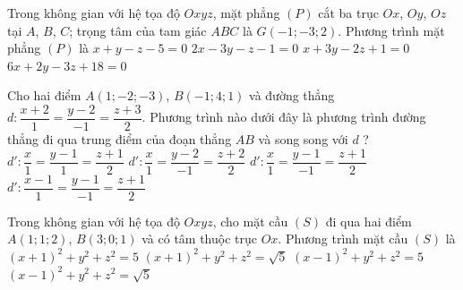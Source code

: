 \begin{ex}%
	Trong không gian với hệ tọa độ $Oxyz$, mặt phẳng $(P)$ cắt ba trục $Ox$, $Oy$, $Oz$ tại $A$, $B$, $C$; trọng tâm của tam giác $ABC$ là $G(-1;-3;2)$. Phương trình mặt phẳng $(P)$ là
	\choice
	{$x+y-z-5=0$}
	{$2x-3y-z-1=0$}
	{$x+3y-2z+1=0$}
	{\True $6x+2y-3z+18=0$}
\end{ex}
\begin{ex}%
	Cho hai điểm $A(1;-2;-3)$, $B(-1;4;1)$ và đường thẳng $d \colon \dfrac{x+2}{1}=\dfrac{y-2}{-1}=\dfrac{z+3}{2}$. Phương trình nào dưới đây là phương trình đường thẳng đi qua trung điểm của đoạn thẳng $AB$ và song song với $d$ ?
	\choice
	{$d' \colon \dfrac{x}{1}=\dfrac{y-1}{1}=\dfrac{z+1}{2}$}
	{$d'\colon \dfrac{x}{1}=\dfrac{y-2}{-1}=\dfrac{z+2}{2}$}
	{\True $d'\colon \dfrac{x}{1}=\dfrac{y-1}{-1}=\dfrac{z+1}{2}$}
	{$d'\colon \dfrac{x-1}{1}=\dfrac{y-1}{-1}=\dfrac{z+1}{2}$}
\end{ex}
\begin{ex}%
	Trong không gian với hệ tọa độ $Oxyz$, cho mặt cầu $(S)$ đi qua hai điểm $A(1;1;2)$, $B(3;0;1)$ và có tâm thuộc trục $Ox$. Phương trình mặt cầu $(S)$ là
	\choice
	{$(x+1)^{2}+y^{2}+z^{2}=5$}
	{$(x+1)^{2}+y^{2}+z^{2}=\sqrt{5}$}
	{\True $(x-1)^{2}+y^{2}+z^{2}=5$}
	{$(x-1)^{2}+y^{2}+z^{2}=\sqrt{5}$}
\end{ex}
